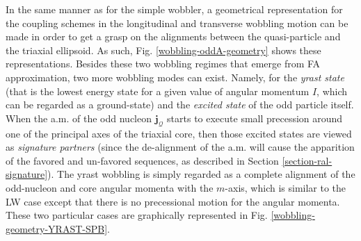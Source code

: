 In the same manner as for the simple wobbler, a geometrical representation for the coupling schemes in the longitudinal and transverse wobbling motion can be made in order to get a grasp on the alignments between the quasi-particle and the triaxial ellipsoid. As such, Fig. \ref{wobbling-oddA-geometry} shows these representations. Besides these two wobbling regimes that emerge from FA approximation, two more wobbling modes can exist. Namely, for the \emph{yrast state} (that is the lowest energy state for a given value of angular momentum $I$, which can be regarded as a ground-state) and the \emph{excited state} of the odd particle itself. When the a.m. of the odd nucleon $\mathbf{j}_\mathcal{Q}$ starts to execute small precession around one of the principal axes of the triaxial core, then those excited states are viewed as \emph{signature partners} (since the de-alignment of the a.m. will cause the apparition of the favored and un-favored sequences, as described in Section \ref{section-ral-signature}). The yrast wobbling is simply regarded as a complete alignment of the odd-nucleon and core angular momenta with the $m$-axis, which is similar to the LW case except that there is no precessional motion for the angular momenta. These two particular cases are graphically represented in Fig. \ref{wobbling-geometry-YRAST-SPB}.
